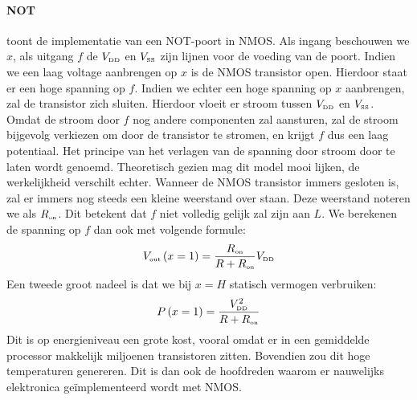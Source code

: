 \paragraph{NOT}  toont de implementatie van een NOT-poort in NMOS. Als ingang beschouwen we $x$, als uitgang $f$ de $V_{\mbox{\tiny DD}}$ en $V_{\mbox{\tiny SS}}$ zijn lijnen voor de voeding van de poort. Indien we een laag voltage aanbrengen op $x$ is de NMOS transistor open. Hierdoor staat er een hoge spanning op $f$. Indien we echter een hoge spanning op $x$ aanbrengen, zal de transistor zich sluiten. Hierdoor vloeit er stroom tussen $V_{\mbox{\tiny DD}}$ en $V_{\mbox{\tiny SS}}$. Omdat de stroom door $f$ nog andere componenten zal aansturen, zal de stroom bijgevolg verkiezen om door de transistor te stromen, en krijgt $f$ dus een laag potentiaal. Het principe van het verlagen van de spanning door stroom door te laten wordt  genoemd. Theoretisch gezien mag dit model mooi lijken, de werkelijkheid verschilt echter. Wanneer de NMOS transistor immers gesloten is, zal er immers nog steeds een kleine weerstand over staan. Deze weerstand noteren we als $R_{\mbox{\tiny on}}$. Dit betekent dat $f$ niet volledig gelijk zal zijn aan $L$. We berekenen de spanning op $f$ dan ook met volgende formule:
\begin{equation}
V_{\mbox{\tiny out}}\left(x=1\right)=\displaystyle\frac{R_{\mbox{\tiny on}}}{R+R_{\mbox{\tiny on}}}V_{\mbox{\tiny DD}}
\end{equation}
Een tweede groot nadeel is dat we bij $x=H$ statisch vermogen verbruiken:
\begin{equation}
P\left(x=1\right)=\displaystyle\frac{V_{\mbox{\tiny DD}}^2}{R+R_{\mbox{\tiny on}}}
\end{equation}
Dit is op energieniveau een grote kost, vooral omdat er in een gemiddelde processor makkelijk miljoenen transistoren zitten. Bovendien zou dit hoge temperaturen genereren. Dit is dan ook de hoofdreden waarom er nauwelijks elektronica ge\"implementeerd wordt met NMOS.
